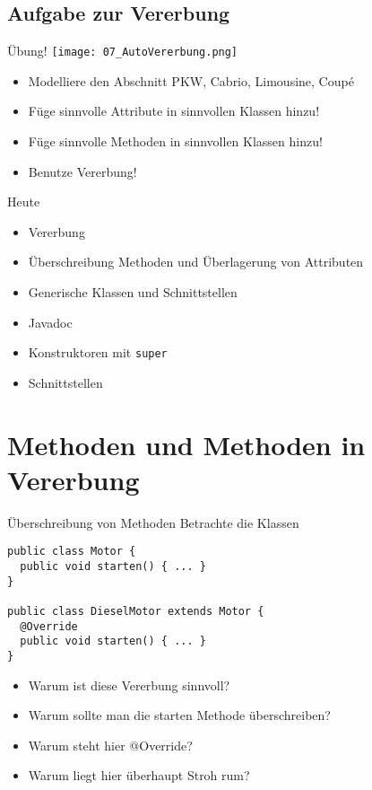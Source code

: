 \documentclass[18pt]{beamer}
\begin{document}
\subsection{Aufgabe zur Vererbung}
\begin{frame}{Übung!}
 \texttt{[image: 07\_AutoVererbung.png]}
 \begin{itemize}
  \item Modelliere den Abschnitt PKW, Cabrio, Limousine, Coupé
  \item Füge sinnvolle Attribute in sinnvollen Klassen hinzu!
  \item Füge sinnvolle Methoden in sinnvollen Klassen hinzu!
  \item Benutze Vererbung!
 \end{itemize}

\end{frame}

\begin{frame}[fragile]{Heute}
\begin{itemize}
 \item Vererbung \checkmark
 \item Überschreibung Methoden und Überlagerung von Attributen
 \item Generische Klassen und Schnittstellen
 \item Javadoc
 \item Konstruktoren mit \verb|super|
 \item Schnittstellen 
\end{itemize}
\end{frame}

\section{Methoden und Methoden in Vererbung}
\begin{frame}[fragile]{Überschreibung von Methoden}
Betrachte die Klassen
\begin{lstlisting}
public class Motor {
  public void starten() { ... }
}

public class DieselMotor extends Motor {
  @Override
  public void starten() { ... }
} 
\end{lstlisting}
\pause
\begin{itemize}
 \item Warum ist diese Vererbung sinnvoll? \pause
 \item Warum sollte man die starten Methode überschreiben? \pause
 \item Warum steht hier @Override? \pause
 \item Warum liegt hier überhaupt Stroh rum?
\end{itemize}
\end{frame}
\end{document}

